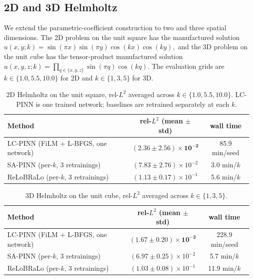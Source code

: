 \documentclass[12pt,a4paper]{extarticle}
\begin{document}
\subsection{2D and 3D Helmholtz}

We extend the parametric-coefficient construction to two and three spatial dimensions. The 2D problem on the unit square has the manufactured solution
\(
    u(x, y; k) = \sin(\pi x) \sin(\pi y) \cos(k x) \cos(k y),
\)
and the 3D problem on the unit cube has the tensor-product manufactured solution
\(
    u(x, y, z; k) = \prod_{q \in \{x, y, z\}} \sin(\pi q) \cos(k q).
\)
The evaluation grids are $k \in \{1.0, 5.5, 10.0\}$ for 2D and $k \in \{1, 3, 5\}$ for 3D.

\begin{table}[H]
\caption{2D Helmholtz on the unit square, rel-$L^2$ averaged across $k \in \{1.0, 5.5, 10.0\}$. LC-PINN is one trained network; baselines are retrained separately at each $k$.}
\label{table:helm2d}
\centering
\begin{tabular}{lcc}
\toprule
Method & rel-$L^2$ (mean $\pm$ std) & wall time \\
\midrule
LC-PINN (FiLM + L-BFGS, one network) & $\mathbf{(2.36 \pm 2.56) \times 10^{-2}}$ & 85.9 min/seed \\
SA-PINN (per-$k$, 3 retrainings)     & $(7.83 \pm 2.76) \times 10^{-2}$         & 3.0 min/$k$ \\
ReLoBRaLo (per-$k$, 3 retrainings)   & $(1.13 \pm 0.17) \times 10^{-1}$         & 5.6 min/$k$ \\
\bottomrule
\end{tabular}
\end{table}

\begin{table}[H]
\caption{3D Helmholtz on the unit cube, rel-$L^2$ averaged across $k \in \{1, 3, 5\}$.}
\label{table:helm3d}
\centering
\begin{tabular}{lcc}
\toprule
Method & rel-$L^2$ (mean $\pm$ std) & wall time \\
\midrule
LC-PINN (FiLM + L-BFGS, one network) & $\mathbf{(1.67 \pm 0.20) \times 10^{-2}}$ & 228.9 min/seed \\
SA-PINN (per-$k$, 3 retrainings)     & $(6.97 \pm 0.25) \times 10^{-2}$         & 5.7 min/$k$ \\
ReLoBRaLo (per-$k$, 3 retrainings)   & $(1.03 \pm 0.08) \times 10^{-1}$         & 11.9 min/$k$ \\
\bottomrule
\end{tabular}
\end{table}
\end{document}
